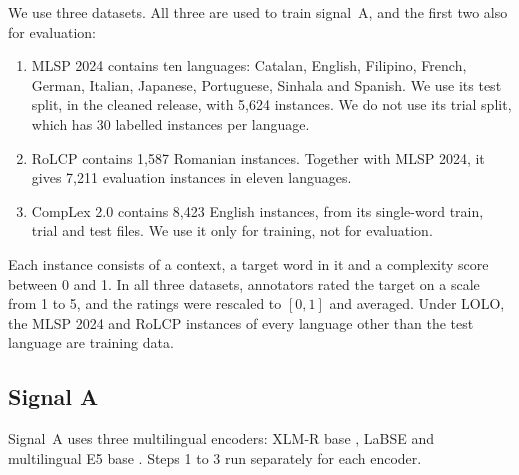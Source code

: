 We use three datasets. All three are used to train signal~A, and the first two also for evaluation: %
\begin{enumerate}
\item MLSP 2024 \citep{shardlow-etal-2024-bea} contains ten languages: Catalan, English, Filipino,
French, German, Italian, Japanese, Portuguese, Sinhala and Spanish. We use its test split, in the
cleaned release, with 5{,}624 instances. We do not use its trial split, which has 30 labelled %
instances per language. %
\item RoLCP \citep{anghel-etal-2025-rals} contains 1{,}587 Romanian instances. Together with MLSP %
2024, it gives 7{,}211 evaluation instances in eleven languages.
\item CompLex 2.0 \citep{shardlow-etal-2021-semeval} contains 8{,}423 English instances, from its %
single-word train, trial and test files. We use it only for training, not for evaluation. %
\end{enumerate}
Each instance consists of a context, a target word in it and a complexity score between 0 and 1. %
In all three datasets, annotators rated the target on a scale from 1 to 5, and the ratings were %
rescaled to $[0, 1]$ and averaged. Under LOLO, the MLSP 2024 and RoLCP instances of every language %
other than the test language are training data.

\subsection{Signal A}
\label{sec:signal-a}

Signal~A uses three multilingual encoders: XLM-R base \citep{conneau2020xlmr}, LaBSE %
\citep{feng-etal-2022-language} and multilingual E5 base \citep{wang2024multilinguale5}. Steps 1 to
3 run separately for each encoder.

